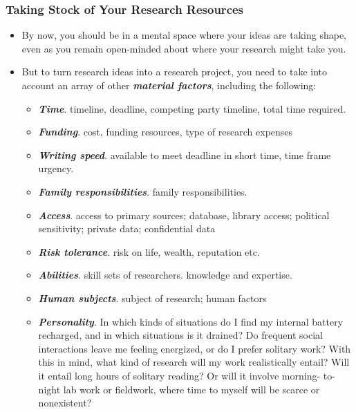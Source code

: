 \documentclass[11pt]{article}
\begin{document}
\subsubsection{Taking Stock of Your Research Resources}
\begin{itemize}
\item By now, you should be in a mental space where your ideas are taking shape, even as you remain open-minded about where your research might take you. 

\item But to turn research ideas into a research project, you need to take into account an array of other \emph{\textbf{material factors}}, including the following:
\begin{itemize}
\item \emph{\textbf{Time}}. timeline, deadline, competing party timeline, total time required. 

\item \emph{\textbf{Funding}}. cost, funding resources, type of research expenses

\item \emph{\textbf{Writing speed}}. available to meet deadline in short time, time frame urgency.

\item \emph{\textbf{Family responsibilities}}. family responsibilities. 

\item \emph{\textbf{Access}}. access to primary sources; database, library access; political sensitivity; private data; confidential data

\item \emph{\textbf{Risk tolerance}}. risk on life, wealth, reputation etc.

\item \emph{\textbf{Abilities}}. skill sets of researchers. knowledge and expertise.

\item \emph{\textbf{Human subjects}}. subject of research; human factors

\item \emph{\textbf{Personality}}. In which kinds of situations do I find my internal battery recharged, and in which situations is it drained? Do frequent social interactions leave me feeling energized, or do I prefer solitary work? With this in mind, what kind of research will my work realistically entail? Will it entail long hours of solitary reading? Or will it involve morning- to- night lab work or fieldwork, where time to myself will be scarce or nonexistent?
\end{itemize}


\end{itemize}
\end{document}
